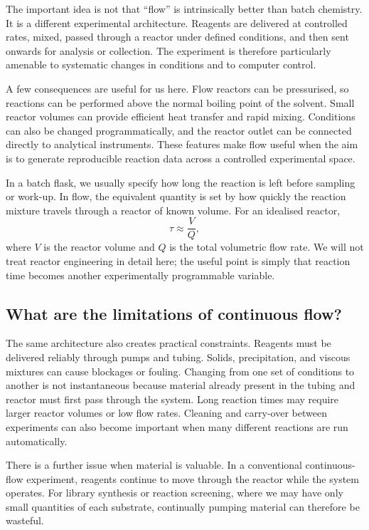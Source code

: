 The important idea is not that ``flow'' is intrinsically better than batch chemistry. It is a different experimental architecture. Reagents are delivered at controlled rates, mixed, passed through a reactor under defined conditions, and then sent onwards for analysis or collection. The experiment is therefore particularly amenable to systematic changes in conditions and to computer control.

A few consequences are useful for us here. Flow reactors can be pressurised, so reactions can be performed above the normal boiling point of the solvent. Small reactor volumes can provide efficient heat transfer and rapid mixing. Conditions can also be changed programmatically, and the reactor outlet can be connected directly to analytical instruments. These features make flow useful when the aim is to generate reproducible reaction data across a controlled experimental space.

In a batch flask, we usually specify how long the reaction is left before sampling or work-up. In flow, the equivalent quantity is set by how quickly the reaction mixture travels through a reactor of known volume. For an idealised reactor,
\[
    \tau \approx \frac{V}{Q},
\]
where $V$ is the reactor volume and $Q$ is the total volumetric flow rate. We will not treat reactor engineering in detail here; the useful point is simply that reaction time becomes another experimentally programmable variable.

\subsection{What are the limitations of continuous flow?}

The same architecture also creates practical constraints. Reagents must be delivered reliably through pumps and tubing. Solids, precipitation, and viscous mixtures can cause blockages or fouling. Changing from one set of conditions to another is not instantaneous because material already present in the tubing and reactor must first pass through the system. Long reaction times may require larger reactor volumes or low flow rates. Cleaning and carry-over between experiments can also become important when many different reactions are run automatically.

There is a further issue when material is valuable. In a conventional continuous-flow experiment, reagents continue to move through the reactor while the system operates. For library synthesis or reaction screening, where we may have only small quantities of each substrate, continually pumping material can therefore be wasteful.

